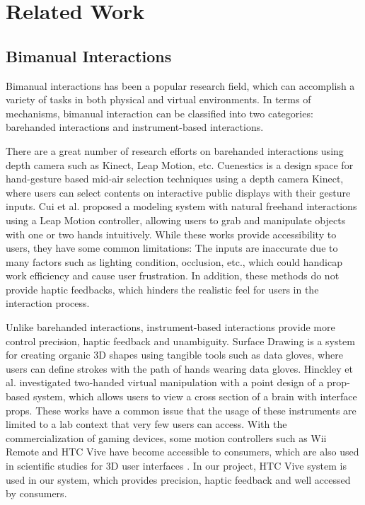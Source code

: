 \documentclass{svjour3}                     %
\begin{document}
\section{Related Work}
\label{sec:2}

\subsection{Bimanual Interactions}
\label{sec:2.1}
Bimanual interactions has been a popular research field, which can accomplish a variety of tasks in both physical and virtual environments.
In terms of mechanisms, bimanual interaction can be classified into two categories: barehanded interactions and instrument-based interactions.

There are a great number of research efforts \cite{walter2014cuenesics,cui2016exploration,ramani2015gesture,murugappan2013handy,han2014virtual} on barehanded interactions using depth camera such as Kinect, Leap Motion, etc.
Cuenestics \cite{walter2014cuenesics} is a design space for hand-gesture based mid-air selection techniques using a depth camera Kinect, where users can select contents on interactive public displays with their gesture inputs.
Cui et al. \cite{cui2016exploration} proposed a modeling system with natural freehand interactions using a Leap Motion controller, allowing users to grab and manipulate objects with one or two hands intuitively.
While these works provide accessibility to users, they have some common limitations: The inputs are inaccurate due to many factors such as lighting condition, occlusion, etc., which could handicap work efficiency and cause user frustration.
In addition, these methods do not provide haptic feedbacks, which hinders the realistic feel for users in the interaction process.

Unlike barehanded interactions, instrument-based interactions provide more control precision, haptic feedback and unambiguity.
Surface Drawing \cite{schkolne2001surface} is a system for creating organic 3D shapes using tangible tools such as data gloves, where users can define strokes with the path of hands wearing data gloves.
Hinckley et al. \cite{hinckley1998two} investigated two-handed virtual manipulation with a point design of a prop-based system, which allows users to view a cross section of a brain with interface props.
These works have a common issue that the usage of these instruments are limited to a lab context that very few users can access.
%
With the commercialization of gaming devices, some motion controllers such as Wii Remote and HTC Vive have become accessible to consumers, which are also used in scientific studies for 3D user interfaces \cite{wingcrave2010wii,niehorster2017accuracy}.
%
In our project, HTC Vive system is used in our system, which provides precision, haptic feedback and well accessed by consumers.
\end{document}
